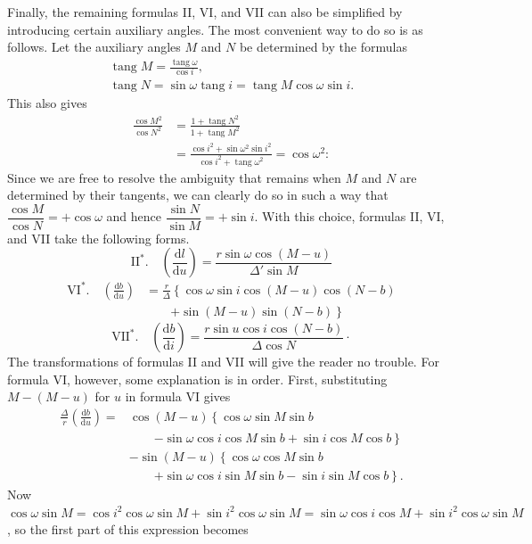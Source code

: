 Finally, the remaining formulas II, VI, and VII can also be simplified by introducing certain auxiliary angles. The most convenient way to do so is as follows. Let the auxiliary angles $M$ and $N$ be determined by the formulas
\[
\begin{gathered}
\operatorname{tang}M = \frac{\operatorname{tang}\omega}{\cos i},\\
\operatorname{tang}N = \sin\omega\operatorname{tang}i = \operatorname{tang}M\cos\omega\sin i.
\end{gathered}
\]
\noindent This also gives
\[
\begin{aligned}
\frac{\cos M^2}{\cos N^2}&=\frac{1+\operatorname{tang}N^2}{1+\operatorname{tang}M^2}\\
&=\frac{\cos i^2+\sin\omega^2\sin i^2}{\cos i^2+\operatorname{tang}\omega^2}=\cos\omega^2:
\end{aligned}
\]
\noindent Since we are free to resolve the ambiguity that remains when $M$ and $N$ are determined by their tangents, we can clearly do so in such a way that $\dfrac{\cos M}{\cos N}=+\cos\omega$ and hence $\dfrac{\sin N}{\sin M}=+\sin i$. With this choice, formulas II, VI, and VII take the following forms.
\[
\mathrm{II}^{*}.\quad \left(\frac{\mathrm{d}l}{\mathrm{d}u}\right) = \frac{r\sin\omega\cos(M-u)}{\Delta'\sin M}
\]
\[
\begin{aligned}
\mathrm{VI}^{*}.\quad \left(\frac{\mathrm{d}b}{\mathrm{d}u}\right)&=\frac{r}{\Delta}\left\{\cos\omega\sin i\cos(M-u)\cos(N-b)\right.\\
&\qquad\left.+\sin(M-u)\sin(N-b)\right\}
\end{aligned}
\]
\[
\mathrm{VII}^{*}.\quad \left(\frac{\mathrm{d}b}{\mathrm{d}i}\right) = \frac{r\sin u\cos i\cos(N-b)}{\Delta\cos N}\mathpunct{\cdot}
\]
\noindent The transformations of formulas II and VII will give the reader no trouble. For formula VI, however, some explanation is in order. First, substituting $M-(M-u)$ for $u$ in formula VI gives
\[
\begin{aligned}
\frac{\Delta}{r}\left(\frac{\mathrm{d}b}{\mathrm{d}u}\right) = {}&\cos(M-u)\left\{\cos\omega\sin M\sin b\right.\\
&\qquad\left.-\sin\omega\cos i\cos M\sin b+\sin i\cos M\cos b\right\}\\
&-\sin(M-u)\left\{\cos\omega\cos M\sin b\right.\\
&\qquad\left.+\sin\omega\cos i\sin M\sin b-\sin i\sin M\cos b\right\}.
\end{aligned}
\]
\noindent Now $\cos\omega\sin M =\allowbreak \cos i^2\cos\omega\sin M +\allowbreak \sin i^2\cos\omega\sin M =\allowbreak \sin\omega\cos i\cos M +\allowbreak \sin i^2\cos\omega\sin M$, so the first part of this expression becomes
